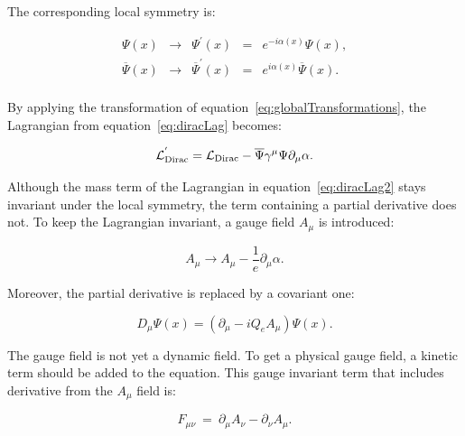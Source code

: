       The corresponding local symmetry is:

      \begin{equation}
            \begin{array}{rcccr}
             \Psi\left(x\right) & \rightarrow & \Psi^{'} \left(x \right) & = & e^{-i\alpha(x)} \Psi\left(x\right), \\
             \overline{\Psi}\left(x\right) & \rightarrow & \overline{\Psi}^{'}\left(x\right) & = & e^{i\alpha(x)}  \overline{\Psi}\left(x\right). \\
            \end{array}
        \label{eq:localTransformations}
      \end{equation}

      By applying the transformation of equation~\ref{eq:globalTransformations}, the Lagrangian from equation~\ref{eq:diracLag} becomes:

      \begin{equation}
        \mathcal{L}^{'}_{\rm{Dirac}} = \mathcal{L}_{\rm{Dirac}} - \overline{\Psi} \gamma^{\mu} \Psi \partial_{\mu} \alpha.
        \label{eq:diracLag2}
      \end{equation}
      
      Although the mass term of the Lagrangian in equation~\ref{eq:diracLag2} stays invariant under the local symmetry, the term containing a partial derivative does not.
      To keep the Lagrangian invariant, a gauge field $A_{\mu}$ is introduced:

      \begin{equation}
        A_{\mu} \rightarrow A_{\mu} - \frac{1}{e} \partial_{\mu} \alpha.
      \end{equation}

      Moreover, the partial derivative is replaced by a covariant one:

      \begin{equation}
        D_{\mu} \Psi\left(x\right) =  \left(\partial_{\mu} - i Q_e A_{\mu}\right) \Psi\left(x\right).
      \end{equation}

      The gauge field is not yet a dynamic field. 
      To get a physical gauge field, a kinetic term should be added to the equation.
      This gauge invariant term that includes derivative from the $A_{\mu}$ field is:
    
      \begin{equation}
        F_{\mu \nu} \ = \ \partial_\mu A_\nu - \partial_\nu A_\mu.
      \end{equation}


